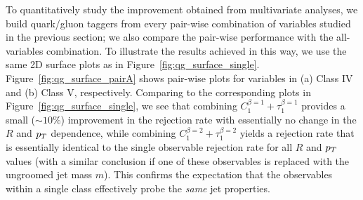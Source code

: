  To quantitatively study the improvement obtained from multivariate analyses, we build quark/gluon taggers from
every pair-wise combination of variables studied in the previous section; we also compare the pair-wise performance with the all-variables combination.
  To illustrate the results achieved in this way, we use the same  2D 
surface plots as in Figure~\ref{fig:qg_surface_single}.  
Figure~\ref{fig:qg_surface_pairA} shows pair-wise plots for variables in (a) Class IV and (b) Class V, respectively.  Comparing to the corresponding plots
in Figure~\ref{fig:qg_surface_single}, we see that combining $C_1^{\beta=1}+\tau_{1}^{\beta=1}$ provides a 
small ($\sim10\%$) improvement in the rejection rate  with essentially no change in the $R$ and $p_T$ dependence, while combining $C_1^{\beta=2}+\tau_{1}^{\beta=2}$   
yields a rejection rate that is essentially identical to the single observable rejection rate for all $R$ and $p_T$ values (with a similar conclusion if one
of these observables is replaced with the ungroomed jet mass $m$).  
This  confirms the expectation that the
observables within a single class effectively probe the \textit{same} jet properties.

